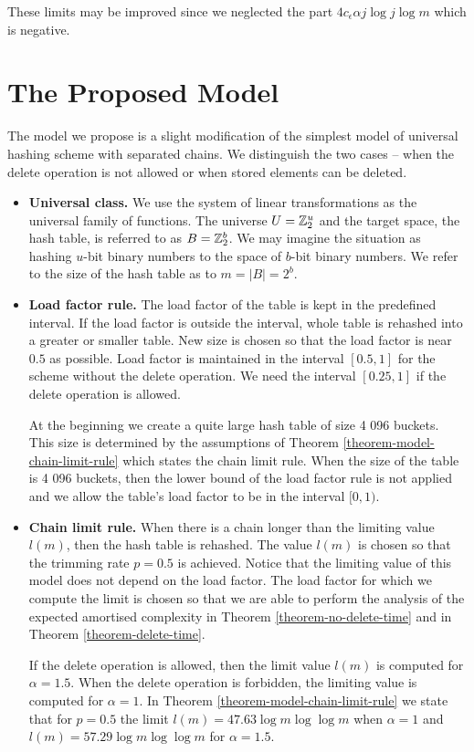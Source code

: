 These limits may be improved since we neglected the part $4 c_\epsilon \alpha j \log j \log m$ which is negative.

\section{The Proposed Model}
\label{section-proposed-model}
The model we propose is a slight modification of the simplest model of universal hashing scheme with separated chains. We distinguish the two cases -- when the delete operation is not allowed or when stored elements can be deleted.
\begin{itemize}
\item \textbf{Universal class.} We use the system of linear transformations as the universal family of functions. The universe $U = \mathbb{Z}_{2}^{u}$ and the target space, the hash table, is referred to as $B = \mathbb{Z}_{2}^{b}$. We may imagine the situation as hashing $u$-bit binary numbers to the space of $b$-bit binary numbers. We refer to the size of the hash table as to $m = |B| = 2 ^ b$.

\item \textbf{Load factor rule.} The load factor of the table is kept in the predefined interval. If the load factor is outside the interval, whole table is rehashed into a greater or smaller table. New size is chosen so that the load factor is near $0.5$ as possible. Load factor is maintained in the interval $\left[0.5, 1\right]$ for the scheme without the delete operation. We need the interval $\left[0.25, 1\right]$ if the delete operation is allowed.

At the beginning we create a quite large hash table of size 4 096 buckets. This size is determined by the assumptions of Theorem \ref{theorem-model-chain-limit-rule} which states the chain limit rule. When the size of the table is 4 096 buckets, then the lower bound of the load factor rule is not applied and we allow the table's load factor to be in the interval $[0, 1)$.

\item \textbf{Chain limit rule.} When there is a chain longer than the limiting value $l(m)$, then the hash table is rehashed. The value $l(m)$ is chosen so that the trimming rate $p = 0.5$ is achieved. Notice that the limiting value of this model does not depend on the load factor. The load factor for which we compute the limit is chosen so that we are able to perform the analysis of the expected amortised complexity in Theorem \ref{theorem-no-delete-time} and in Theorem \ref{theorem-delete-time}.

If the delete operation is allowed, then the limit value $l(m)$ is computed for $\alpha = 1.5$. When the delete operation is forbidden, the limiting value is computed for $\alpha = 1$. In Theorem \ref{theorem-model-chain-limit-rule} we state that for $p = 0.5$ the limit $l(m) = 47.63 \log m \log \log m$ when $\alpha = 1$ and $l(m) = 57.29 \log m \log \log m$ for $\alpha = 1.5$.

\end{itemize}

